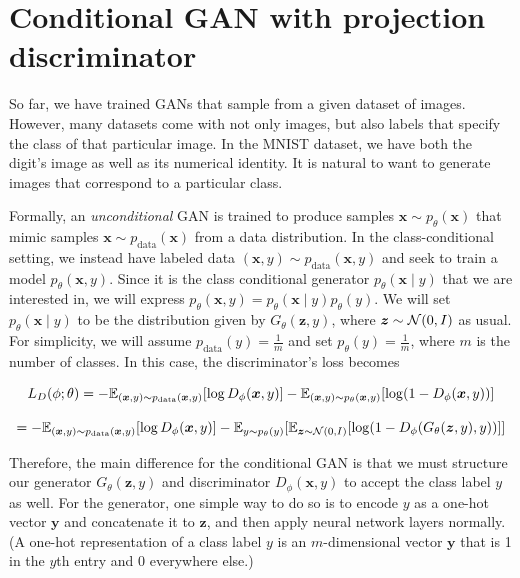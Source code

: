 \section{Conditional GAN with projection discriminator}

So far, we have trained GANs that sample from a given dataset of images. However, many datasets come with not only images, 
but also labels that specify the class of that particular image. In the MNIST dataset, we have both the digit’s 
image as well as its numerical identity. It is natural to want to generate images that correspond to a particular class.

Formally, an \textit{unconditional} GAN is trained to produce samples $\bm{x} \sim p_{\theta}(\bm{x})$ that mimic samples 
$\bm{x} \sim p_{\text{data}}(\bm{x})$ from a data distribution. In the class-conditional setting, we instead have 
labeled data $(\bm{x}, y) \sim p_{\text{data}}(\bm{x}, y)$ and seek to train a model $p_{\theta}(\bm{x},y)$. 
Since it is the class conditional generator $p_{\theta}(\bm{x} \mid y)$ that we are interested in, we will express 
$p_{\theta}(\bm{x},y) = p_{\theta}(\bm{x} \mid y)p_{\theta}(y)$. We will set $p_{\theta}(\bm{x} \mid y)$ to be the distribution 
given by $G_{\theta}(\bm{z},y)$, where $\bm{z} \sim \mathcal{N}(0,I)$ as usual. For simplicity, we will assume 
$p_{\text{data}}(y) = \frac{1}{m}$ and set $p_{\theta}(y) = \frac{1}{m}$, where $m$ is the number of classes. 
In this case, the discriminator’s loss becomes

\begin{equation} \label{eq:17}
    L_D(\phi; \theta) = - \mathbb{E}_{(\bm{x}, y) \sim p_{\text{data}}(\bm{x}, y)}[\log D_{\phi}(\bm{x}, y)] - \mathbb{E}_{(\bm{x},y) \sim p_{\theta}(\bm{x},y)}[\log (1 - D_{\phi}(\bm{x},y))]
\end{equation}

\begin{equation} \label{eq:18}
   = - \mathbb{E}_{(\bm{x}, y) \sim p_{\text{data}}(\bm{x}, y)}[\log D_{\phi}(\bm{x}, y)] - \mathbb{E}_{y \sim p_{\theta}(y)}[ \mathbb{E}_{\bm{z} \sim \mathcal{N}(0,I)}[ \log (1 - D_{\phi}(G_{\theta}(\bm{z}, y), y))]]
\end{equation}

Therefore, the main difference for the conditional GAN is that we must structure our generator $G_{\theta}(\bm{z},y)$ 
and discriminator $D_{\phi}(\bm{x}, y)$ to accept the class label $y$ as well. For the generator, one simple way to do 
so is to encode $y$ as a one-hot vector $\bm{y}$ and concatenate it to $\bm{z}$, and then apply neural network layers normally. 
(A one-hot representation of a class label $y$ is an $m$-dimensional vector $\bm{y}$ that is 1 in the $y$th entry and 0 
everywhere else.) 

